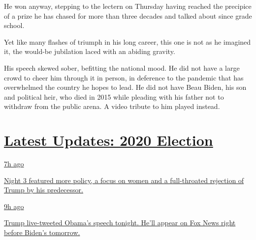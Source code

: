 He won anyway, stepping to the lectern on Thursday having reached the
precipice of a prize he has chased for more than three decades and
talked about since grade school.

Yet like many flashes of triumph in his long career, this one is not as
he imagined it, the would-be jubilation laced with an abiding gravity.

His speech skewed sober, befitting the national mood. He did not have a
large crowd to cheer him through it in person, in deference to the
pandemic that has overwhelmed the country he hopes to lead. He did not
have Beau Biden, his son and political heir, who died in 2015 while
pleading with his father not to withdraw from the public arena. A video
tribute to him played instead.

\hypertarget{latest-updates-2020-election}{%
\section{\texorpdfstring{\href{https://www.nytimes3xbfgragh.onion/live/2020/08/19/us/dnc-convention-election?action=click\&pgtype=Article\&state=default\&region=MAIN_CONTENT_1\&context=storylines_live_updates}{Latest
Updates: 2020
Election}}{Latest Updates: 2020 Election}}\label{latest-updates-2020-election}}

\href{https://www.nytimes3xbfgragh.onion/live/2020/08/19/us/dnc-convention-election?action=click\&pgtype=Article\&state=default\&region=MAIN_CONTENT_1\&context=storylines_live_updates\#night-3-featured-more-policy-a-focus-on-women-and-a-full-throated-rejection-of-trump-by-his-predecessor}{7h
ago}

\href{https://www.nytimes3xbfgragh.onion/live/2020/08/19/us/dnc-convention-election?action=click\&pgtype=Article\&state=default\&region=MAIN_CONTENT_1\&context=storylines_live_updates\#night-3-featured-more-policy-a-focus-on-women-and-a-full-throated-rejection-of-trump-by-his-predecessor}{Night
3 featured more policy, a focus on women and a full-throated rejection
of Trump by his predecessor.}

\href{https://www.nytimes3xbfgragh.onion/live/2020/08/19/us/dnc-convention-election?action=click\&pgtype=Article\&state=default\&region=MAIN_CONTENT_1\&context=storylines_live_updates\#trump-live-tweeted-obamas-speech-tonight-hell-appear-on-fox-news-right-before-bidens-tomorrow}{9h
ago}

\href{https://www.nytimes3xbfgragh.onion/live/2020/08/19/us/dnc-convention-election?action=click\&pgtype=Article\&state=default\&region=MAIN_CONTENT_1\&context=storylines_live_updates\#trump-live-tweeted-obamas-speech-tonight-hell-appear-on-fox-news-right-before-bidens-tomorrow}{Trump
live-tweeted Obama's speech tonight. He'll appear on Fox News right
before Biden's tomorrow.}

